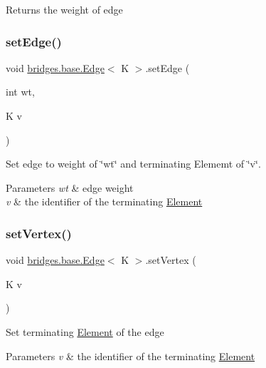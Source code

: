 \begin{DoxyReturn}{Returns}
the weight of edge 
\end{DoxyReturn}
\hypertarget{classbridges_1_1base_1_1_edge_ae7764323dbfbaba26ed79be07ab0762d}{}\label{classbridges_1_1base_1_1_edge_ae7764323dbfbaba26ed79be07ab0762d} 
\subsubsection{\texorpdfstring{set\+Edge()}{setEdge()}}
{\footnotesize\ttfamily void \hyperlink{classbridges_1_1base_1_1_edge}{bridges.\+base.\+Edge}$<$ K $>$.set\+Edge (\begin{DoxyParamCaption}\item[{int}]{wt,  }\item[{K}]{v }\end{DoxyParamCaption})}

Set edge to weight of \char`\"{}wt\char`\"{} and terminating Elememt of \char`\"{}v\char`\"{}.


\begin{DoxyParams}{Parameters}
{\em wt} & edge weight \\
\hline
{\em v} & the identifier of the terminating \hyperlink{classbridges_1_1base_1_1_element}{Element} \\
\hline
\end{DoxyParams}
\hypertarget{classbridges_1_1base_1_1_edge_aad504e0c684d897986abf96cbea0d54b}{}\label{classbridges_1_1base_1_1_edge_aad504e0c684d897986abf96cbea0d54b} 
\subsubsection{\texorpdfstring{set\+Vertex()}{setVertex()}}
{\footnotesize\ttfamily void \hyperlink{classbridges_1_1base_1_1_edge}{bridges.\+base.\+Edge}$<$ K $>$.set\+Vertex (\begin{DoxyParamCaption}\item[{K}]{v }\end{DoxyParamCaption})}

Set terminating \hyperlink{classbridges_1_1base_1_1_element}{Element} of the edge


\begin{DoxyParams}{Parameters}
{\em v} & the identifier of the terminating \hyperlink{classbridges_1_1base_1_1_element}{Element} \\
\hline
\end{DoxyParams}
\hypertarget{classbridges_1_1base_1_1_edge_a25eadea2591fb65c9fb681cc297ac7a8}{}\label{classbridges_1_1base_1_1_edge_a25eadea2591fb65c9fb681cc297ac7a8} 
